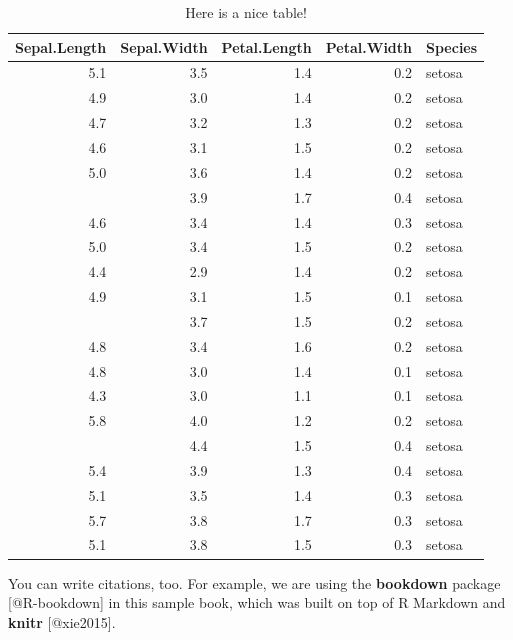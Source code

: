\documentclass[]{book}
\begin{document}
\begin{table}

\caption{\label{tab:nice-tab}Here is a nice table!}
\centering
\begin{tabular}[t]{rrrrl}
\toprule
Sepal.Length & Sepal.Width & Petal.Length & Petal.Width & Species\\
\midrule
5.1 & 3.5 & 1.4 & 0.2 & setosa\\
4.9 & 3.0 & 1.4 & 0.2 & setosa\\
4.7 & 3.2 & 1.3 & 0.2 & setosa\\
4.6 & 3.1 & 1.5 & 0.2 & setosa\\
5.0 & 3.6 & 1.4 & 0.2 & setosa\\
\addlinespace
5.4 & 3.9 & 1.7 & 0.4 & setosa\\
4.6 & 3.4 & 1.4 & 0.3 & setosa\\
5.0 & 3.4 & 1.5 & 0.2 & setosa\\
4.4 & 2.9 & 1.4 & 0.2 & setosa\\
4.9 & 3.1 & 1.5 & 0.1 & setosa\\
\addlinespace
5.4 & 3.7 & 1.5 & 0.2 & setosa\\
4.8 & 3.4 & 1.6 & 0.2 & setosa\\
4.8 & 3.0 & 1.4 & 0.1 & setosa\\
4.3 & 3.0 & 1.1 & 0.1 & setosa\\
5.8 & 4.0 & 1.2 & 0.2 & setosa\\
\addlinespace
5.7 & 4.4 & 1.5 & 0.4 & setosa\\
5.4 & 3.9 & 1.3 & 0.4 & setosa\\
5.1 & 3.5 & 1.4 & 0.3 & setosa\\
5.7 & 3.8 & 1.7 & 0.3 & setosa\\
5.1 & 3.8 & 1.5 & 0.3 & setosa\\
\bottomrule
\end{tabular}
\end{table}

You can write citations, too. For example, we are using the
\textbf{bookdown} package {[}@R-bookdown{]} in this sample book, which
was built on top of R Markdown and \textbf{knitr} {[}@xie2015{]}.
\end{document}
